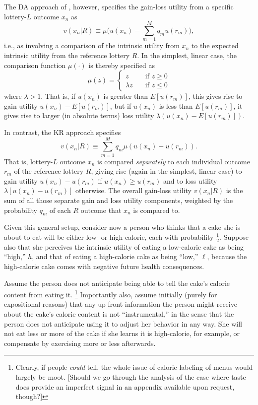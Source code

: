 \documentclass[11pt,reqno]{amsart}
\newcommand{\half}{\tfrac{1}{2}}
\begin{document}
The DA approach of \citet{bell85}, however, specifies the gain-loss utility
from a specific lottery-$L$ outcome $x_n$ as
\begin{equation}
  v(x_n|R) \equiv \mu\biggl(u(x_n) - \sum_{m=1}^M q_m
  u(r_m)\biggr),\label{eqn:vda}
\end{equation}
i.e., as involving a comparison of the intrinsic utility from $x_n$ to the
expected intrinsic utility from the reference lottery $R$. In the simplest, linear case,
the comparison function $\mu(\cdot)$ is thereby specified as
\begin{equation*}
      \mu(z) =
\begin{cases}
        z\quad         &\text{if $z \geq 0$}\\
        \lambda z\quad &\text{if $z \leq 0$}
      \end{cases}
\end{equation*}
where $\lambda > 1$. That is, if $u(x_n)$ is greater than $E[u(r_m)]$, this gives rise to gain
utility $u(x_n) - E[u(r_m)]$, but if $u(x_n)$ is less than $E[u(r_m)]$, it gives
rise to larger (in absolute terms) loss utility $\lambda(u(x_n) - E[u(r_m)])$.

In contrast, the KR approach specifies
\begin{equation}
   v(x_n|R) \equiv \sum_{m=1}^M q_m \mu(u(x_n) - u(r_m)).
\end{equation}
That is, lottery-$L$ outcome $x_n$ is compared {\em separately} to each
individual outcome $r_m$ of the reference lottery $R$, giving rise (again in
the simplest, linear case) to gain utility $u(x_n) - u(r_m)$ if $u(x_n) \geq
u(r_m)$ and to loss utility $\lambda[u(x_n) - u(r_m)]$ otherwise. The overall
gain-loss utility $v(x_n|R)$ is the sum of all those separate gain and loss
utility components, weighted by the probability $q_m$ of each $R$ outcome that
$x_n$ is compared to. 

Given this general setup, consider now a person who thinks that a cake she is
about to eat will be either low- or high-calorie, each with probability
$\half$. Suppose also that she perceives the intrinsic utility of eating a
low-calorie cake as being ``high,'' $h$, and that of eating a high-calorie
cake as being ``low,'' $\ell$, because the high-calorie cake comes with
negative future health consequences. 

Assume the person does not anticipate being able to tell the cake's calorie
content from eating it.%
\footnote{%
  Clearly, if people {\em could} tell, the whole issue of calorie labeling of
 menus would largely be moot. {\color{red} [Should we go through the analysis
 of the case where taste does provide an imperfect signal in an appendix
 available upon request, though?]}
} %
Importantly also, assume initially (purely for expositional reasons) that any
up-front information the person might receive about the cake's calorie content
is not ``instrumental,'' in the sense that the person does not anticipate
using it to adjust her behavior in any way. She will not eat less or more of
the cake if she learns it is high-calorie, for example, or compensate by
exercising more or less afterwards. 
\end{document}
